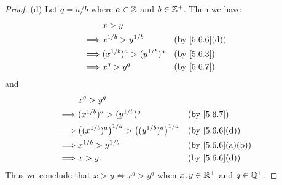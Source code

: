 \begin{proof}{(d)}
  Let \(q = a / b\) where \(a \in \mathbb{Z}\) and \(b \in \mathbb{Z}^+\).
  Then we have
  \begin{align*}
             & x > y                                                          \\
    \implies & x^{1 / b} > y^{1 / b}         &  & \text{(by \cref{5.6.6}(d))} \\
    \implies & (x^{1 / b})^a > (y^{1 / b})^a &  & \by{5.6.3}                  \\
    \implies & x^q > y^q                     &  & \by{5.6.7}
  \end{align*}
  and
  \begin{align*}
             & x^q > y^q                                                                                             \\
    \implies & (x^{1 / b})^a > (y^{1 / b})^a                                     &  & \by{5.6.7}                     \\
    \implies & \big((x^{1 / b})^a\big)^{1 / a} > \big((y^{1 / b})^a\big)^{1 / a} &  & \text{(by \cref{5.6.6}(d))}    \\
    \implies & x^{1 / b} > y^{1 / b}                                             &  & \text{(by \cref{5.6.6}(a)(b))} \\
    \implies & x > y.                                                            &  & \text{(by \cref{5.6.6}(d))}
  \end{align*}
  Thus we conclude that \(x > y \iff x^q > y^q\) when \(x, y \in \mathbb{R}^+\) and \(q \in \mathbb{Q}^+\).
\end{proof}

